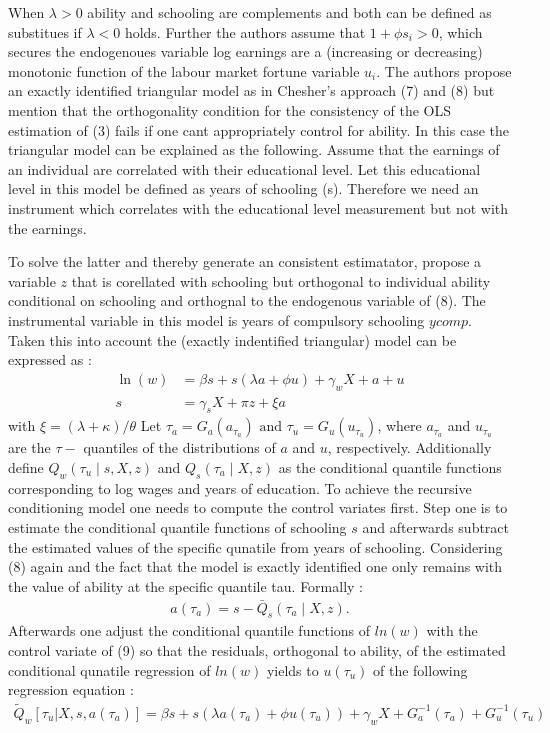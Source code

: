 \documentclass[12pt,a4paper]{article}
\begin{document}
When \(\lambda>0\) ability and schooling are complements and both can be
defined as substitues if \(\lambda<0\) holds. Further the authors assume
that \(1+ \phi s_i > 0\), which secures the endogenoues variable log
earnings are a (increasing or decreasing) monotonic function of the
labour market fortune variable \(u_i\). The authors propose an exactly
identified triangular model as in Chesher's approach (7) and (8) but
mention that the orthogonality condition for the consistency of the OLS
estimation of (3) fails if one cant appropriately control for ability.
In this case the triangular model can be explained as the following.
Assume that the earnings of an individual are correlated with their
educational level. Let this educational level in this model be defined
as years of schooling (s). Therefore we need an instrument which
correlates with the educational level measurement but not with the
earnings.

To solve the latter and thereby generate an consistent estimatator,
\textcite{brunello} propose a variable \(z\) that is corellated with
schooling but orthogonal to individual ability conditional on schooling
and orthognal to the endogenous variable of (8). The instrumental
variable in this model is years of compulsory schooling \(ycomp\). Taken
this into account the (exactly indentified triangular) model can be
expressed as :
\begin{align} \ln(w)&=\beta s+s(\lambda a+\phi u)+\gamma_{w} X+a+u \\
s&=\gamma_{s} X+\pi z+\xi a \end{align} with
\(\xi=(\lambda+\kappa) / \theta\) Let
\(\tau_{a}=G_{a}\left(a_{\tau_{a}}\right) \text { and } \tau_{u}=G_{u}\left(u_{\tau_{u}}\right)\),
where \(a_{\tau_{a}}\) and \(u_{\tau_{u}}\) are the \(\tau-\) quantiles
of the distributions of \(a\) and \(u\), respectively. Additionally
define \(Q_{w}\left(\tau_{u}\mid s,X,z\right)\) and
\(Q_{s}\left(\tau_{a}\mid X,z\right)\) as the conditional quantile
functions corresponding to log wages and years of education. To achieve
the recursive conditioning model one needs to compute the control
variates first. Step one is to estimate the conditional quantile
functions of schooling \(s\) and afterwards subtract the estimated
values of the specific qunatile from years of schooling. Considering (8)
again and the fact that the model is exactly identified one only remains
with the value of ability at the specific quantile tau. Formally :
\begin{align}a\left(\tau_{a}\right)=s-\bar{Q}_{s}\left(\tau_{a}\mid X,z\right).\end{align}
Afterwards one adjust the conditional quantile functions of \(ln(w)\)
with the control variate of (9) so that the residuals, orthogonal to
ability, of the estimated conditional qunatile regression of \(ln(w)\)
yields to \(u(\tau_u)\) of the following regression equation :
\begin{align}
\tilde{Q}_w[\tau_u|X, s, a(\tau_a)] = \beta s + s(\lambda a(\tau_a) + \phi u(\tau_u)) + \gamma_w X + G_{a}^{-1}\left(\tau_{a}\right) + G_{u}^{-1}\left(\tau_{u}\right)
\end{align}
\end{document}
